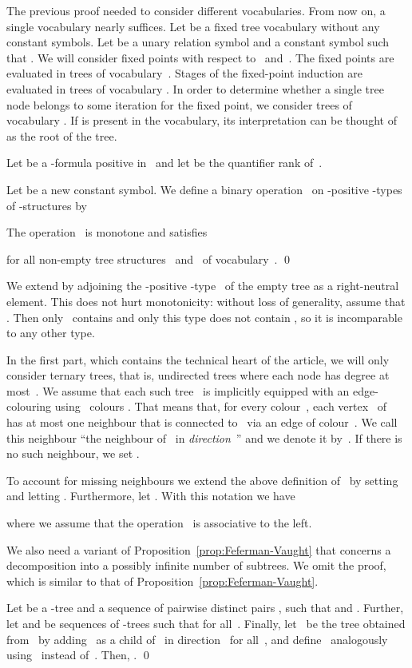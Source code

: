 \documentclass{LMCS}
\begin{document}
The previous proof needed to consider different vocabularies.
From now on, a single vocabulary nearly suffices.
Let  be a fixed tree vocabulary without any constant symbols.
Let  be a unary relation symbol and  a constant symbol
such that .
We will consider fixed points with respect to ~and~.
The fixed points are evaluated in trees of vocabulary~.
Stages of the fixed-point induction are evaluated
in trees of vocabulary .
In order to determine whether a single tree node
belongs to some iteration for the fixed point,
we consider trees of vocabulary .
If  is present in the vocabulary,
its interpretation can be thought of as the root of the tree.

Let  be a -formula positive in~
and let  be the quantifier rank of~.

\begin{cor}
Let  be a new constant symbol.
We define a binary operation~
on -positive -types of -structures by

The operation~ is monotone and satisfies

for all non-empty tree structures ~and~ of vocabulary~.
\qed\end{cor}

We extend  by adjoining the -positive -type~ of the empty tree
as a right-neutral element.
This does not hurt monotonicity\?:
without loss of generality, assume that .
Then only~ contains 
and only this type does not contain ,
so it is incomparable to any other type.

In the first part, which contains the technical heart of the article,
we will only consider ternary trees, that is,
undirected trees where each node has degree at most~.
We assume that each such tree~ is implicitly equipped
with an edge-colouring using ~colours .
That means that, for every colour~,
each vertex~ of~ has at most one neighbour
that is connected to~ via an edge of colour~.
We call this neighbour ``the neighbour of~ in \emph{direction}~''
and we denote it by~.
If there is no such neighbour, we set .

To account for missing neighbours we extend the above
definition of~
by setting 
and letting .
Furthermore, let .
With this notation we have

where we assume that the operation~ is associative to the left.

We also need a variant of Proposition~\ref{prop:Feferman-Vaught}
that concerns a decomposition into a possibly infinite number of subtrees.
We omit the proof, which is similar to that of Proposition~\ref{prop:Feferman-Vaught}.
\begin{prop}\label{prop:Feferman-Vaught II}
Let  be a -tree and 
a sequence of pairwise distinct pairs ,
such that  and .
Further, let  and 
be sequences of -trees
such that  for all~.
Finally, let ~be the tree obtained from~
by adding~ as a child of~
in direction~ for all~,
and define~ analogously using~ instead of~.
Then, .
\qed\end{prop}
\end{document}
